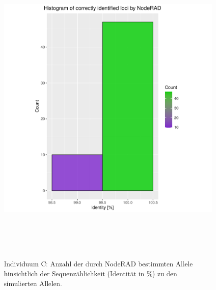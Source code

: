 \begin{figure}[H]
	\begin{center}
		\includegraphics[height=16cm]{bilder/evaluation/hist_perc_ident/C.plot_hist.pdf}
		\caption{Individuum C: Anzahl der durch NodeRAD bestimmten Allele hinsichtlich der Sequenzählichkeit (Identität in $ \% $) zu den simulierten Allelen.}
	\end{center}
\end{figure}

